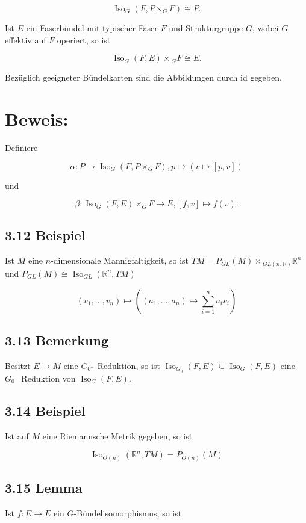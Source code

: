 \documentclass[10pt, letterpaper]{article}
\begin{document}
$$
\operatorname{Iso}_{G}\left(F, P \times_{G} F\right) \cong P .
$$

Ist $E$ ein Faserbündel mit typischer Faser $F$ und Strukturgruppe $G$, wobei $G$ effektiv auf $F$ operiert, so ist

$$
\operatorname{Iso}_{G}(F, E) \times{ }_{G} F \cong E .
$$

Bezüglich geeigneter Bündelkarten sind die Abbildungen durch id gegeben.

\section*{Beweis:}
Definiere

$$
\alpha: P \rightarrow \operatorname{Iso}_{G}\left(F, P \times_{G} F\right), p \mapsto(v \mapsto[p, v])
$$

und

$$
\beta: \operatorname{Iso}_{G}(F, E) \times_{G} F \rightarrow E,[f, v] \mapsto f(v) .
$$

\subsection*{3.12 Beispiel}
Ist $M$ eine $n$-dimensionale Mannigfaltigkeit, so ist $T M=P_{G L}(M) \times{ }_{G L(n, \mathbb{R})} \mathbb{R}^{n}$ und $P_{G L}(M) \cong \operatorname{Iso}_{G L}\left(\mathbb{R}^{n}, T M\right)$

$$
\left(v_{1}, \ldots, v_{n}\right) \mapsto\left(\left(a_{1}, \ldots, a_{n}\right) \mapsto \sum_{i=1}^{n} a_{i} v_{i}\right)
$$

\subsection*{3.13 Bemerkung}
Besitzt $E \rightarrow M$ eine $G_{0^{-}}$-Reduktion, so ist $\operatorname{Iso}_{G_{0}}(F, E) \subseteq \operatorname{Iso}_{G}(F, E)$ eine $G_{0^{-}}$ Reduktion von $\operatorname{Iso}_{G}(F, E)$.

\subsection*{3.14 Beispiel}
Ist auf $M$ eine Riemannsche Metrik gegeben, so ist

$$
\operatorname{Iso}_{O(n)}\left(\mathbb{R}^{n}, T M\right)=P_{O(n)}(M)
$$

\subsection*{3.15 Lemma}
Ist $f: E \rightarrow \tilde{E}$ ein $G$-Bündelisomorphismus, so ist
\end{document}
